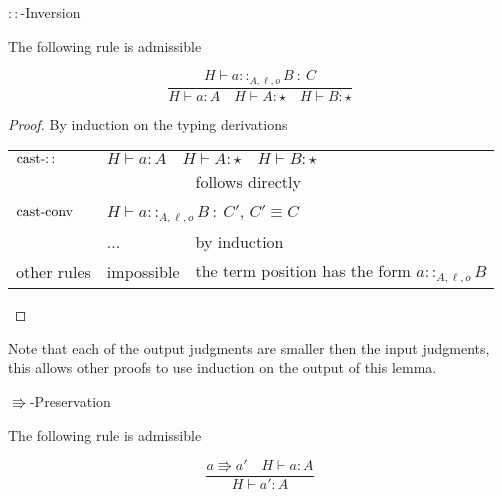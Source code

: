 \begin{lem}
$::$-Inversion

The following rule is admissible
\end{lem}

\[
\frac{H\vdash a::_{A,\ensuremath{\ell},o}B\::\:C}{H\vdash a:A\quad H\vdash A:\star\quad H\vdash B:\star}
\]

\begin{proof}
By induction on the typing derivations

\begin{tabular}{lll}
$\operatorname{cast-::}$ & \multicolumn{2}{l}{$H\vdash a:A\quad H\vdash A:\star\quad H\vdash B:\star$}\tabularnewline
 &  & follows directly\tabularnewline
$\operatorname{cast-conv}$ & \multicolumn{2}{l}{$H\vdash a::_{A,\ensuremath{\ell},o}B\::\:C'$, $C'\equiv C$}\tabularnewline
 & ... & by induction\tabularnewline
other rules & impossible & the term position has the form $a::_{A,\ensuremath{\ell},o}B$\tabularnewline
\end{tabular}
\end{proof}
Note that each of the output judgments are smaller then the input judgments, this allows other proofs to use induction on the output of this lemma.
\begin{thm}
$\Rrightarrow$-Preservation 

The following rule is admissible

\[
\frac{a\Rrightarrow a'\quad H\vdash a:A}{H\vdash a':A}
\]
\end{thm}

